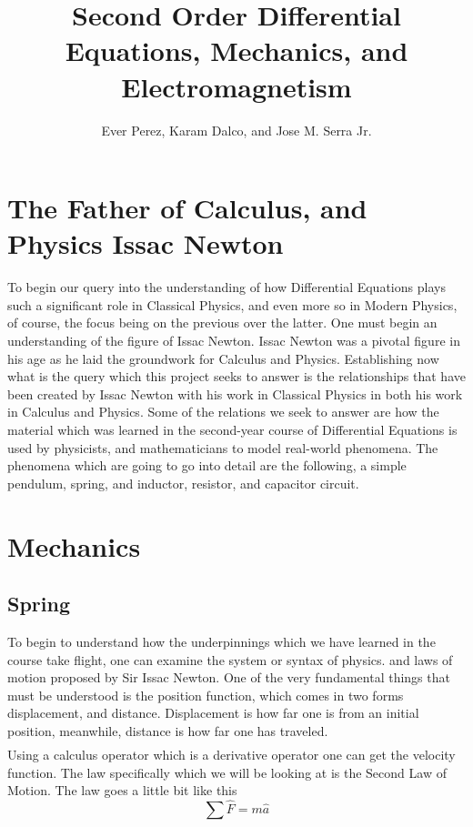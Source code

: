 \documentclass[11pt]{article} %
\title{Second Order Differential Equations, Mechanics, and Electromagnetism}
\author{Ever Perez, Karam Dalco, and Jose M. Serra Jr.}
\begin{document}
\maketitle
\newpage
\tableofcontents
\newpage
\section{The Father of Calculus, and Physics Issac Newton}

To begin our query into the understanding of how Differential Equations plays such a significant role in Classical Physics, and even more so in Modern Physics, of course, the focus being on the previous over the latter. One must begin an understanding of the figure of Issac Newton. Issac Newton was a pivotal figure in his age as he laid the groundwork for Calculus and Physics. Establishing now what is the query which this project seeks to answer is the relationships that have been created by Issac Newton with his work in Classical Physics in both his work in Calculus and Physics. Some of the relations we seek to answer are how the material which was learned in the second-year course of Differential Equations is used by physicists, and mathematicians to model real-world phenomena. The phenomena which are going to go into detail are the following, a simple pendulum, spring, and inductor, resistor, and capacitor circuit.

\newpage
\section{Mechanics}
\subsection{Spring}
To begin to understand how the underpinnings which we have learned in the course take flight, one can examine the system or syntax of physics. and laws of motion proposed by Sir Issac Newton. One of the very fundamental things that must be understood is the position function, which comes in two forms displacement, and distance. Displacement is how far one is from an initial position, meanwhile, distance is how far one has traveled. \begin{align*} \end{align*} Using a calculus operator which is a derivative operator one can get the velocity function. The law specifically which we will be looking at is the Second Law of Motion. The law goes a little bit like this \begin{equation}\sum \hat{F} = m\hat{a} \end{equation} 
\end{document}
